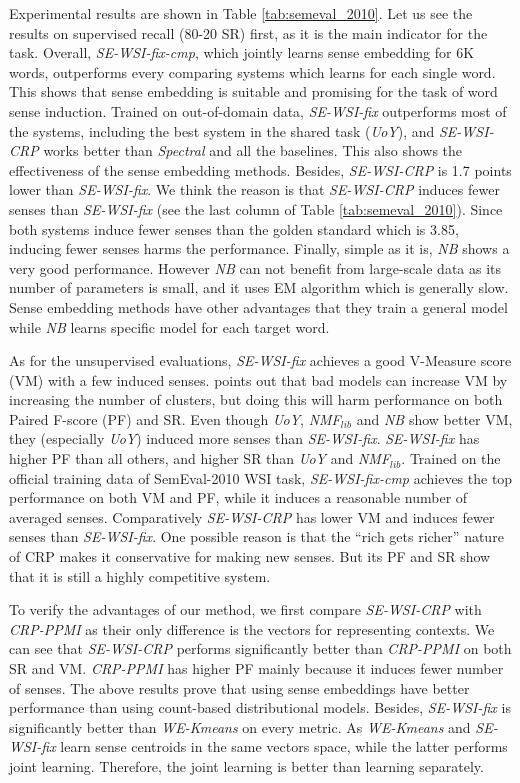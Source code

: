 \documentclass[11pt]{article}
\begin{document}
Experimental results are shown in Table \ref{tab:semeval_2010}. Let us see the results on supervised recall (80-20 SR) first, as it is the main indicator for the task. 
Overall, \emph{SE-WSI-fix-cmp}, which jointly learns sense embedding for 6K words, outperforms every comparing systems which learns for each single word. 
This shows that sense embedding is suitable and promising for the task of word sense induction.
Trained on out-of-domain data, \emph{SE-WSI-fix} outperforms most of the systems, including the best system in the shared task (\emph{UoY}), and
\emph{SE-WSI-CRP} works better than \emph{Spectral} and all the baselines.
This also shows the effectiveness of the sense embedding methods.
Besides, \emph{SE-WSI-CRP} is 1.7 points lower than \emph{SE-WSI-fix}.
We think the reason is that \emph{SE-WSI-CRP} induces fewer senses than \emph{SE-WSI-fix} (see the last column of Table \ref{tab:semeval_2010}).
Since both systems induce fewer senses than the golden standard which is 3.85, inducing fewer senses harms the performance.
Finally, simple as it is, \emph{NB} shows a very good performance.
However \emph{NB} can not benefit from large-scale data as its number of parameters is small,
and it uses EM algorithm which is generally slow. Sense embedding methods have other advantages that they train a general model while \emph{NB} learns specific model for each target word.


As for the unsupervised evaluations, \emph{SE-WSI-fix} achieves a good V-Measure score (VM) with a few induced senses. 
 points out that bad models can increase VM by increasing the number of clusters, but doing this will harm performance on both Paired F-score (PF) and SR.
Even though \emph{UoY}, \emph{NMF$_{lib}$} and \emph{NB} show better VM, they (especially \emph{UoY}) induced more senses than \emph{SE-WSI-fix}.
\emph{SE-WSI-fix} has higher PF than all others, and higher SR than \emph{UoY} and \emph{NMF$_{lib}$}.
Trained on the official training data of SemEval-2010 WSI task, \emph{SE-WSI-fix-cmp} achieves the top performance on both VM and PF, while it induces a reasonable number of averaged senses.
Comparatively \emph{SE-WSI-CRP} has lower VM and induces fewer senses than \emph{SE-WSI-fix}.
One possible reason is that the ``rich gets richer'' nature of CRP makes it conservative for making new senses.
But its PF and SR show that it is still a highly competitive system.



To verify the advantages of our method, we first compare \emph{SE-WSI-CRP} with \emph{CRP-PPMI} as their only difference is the vectors for representing contexts.
We can see that \emph{SE-WSI-CRP} performs significantly better than \emph{CRP-PPMI} on both SR and VM.
\emph{CRP-PPMI} has higher PF mainly because it induces fewer number of senses.
The above results prove that using sense embeddings have better performance than using count-based distributional models.
Besides, \emph{SE-WSI-fix} is significantly better than \emph{WE-Kmeans} on every metric.
As \emph{WE-Kmeans} and \emph{SE-WSI-fix} learn sense centroids in the same vectors space, while the latter performs joint learning.
Therefore, the joint learning is better than learning separately.
\end{document}
